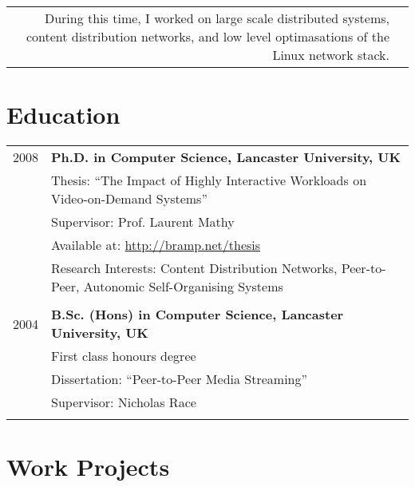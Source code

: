 \documentclass[a4paper,10pt]{article}
\begin{document}
\begin{tabular}{r|p{13.5cm}}
			During this time, I worked on large scale distributed systems, content distribution networks, and low level optimasations of the Linux
			network stack.
			\\


\end{tabular}

\section{Education}
\begin{tabular}{rp{14cm}}	
 \textsc{2008} & \textbf{Ph.D. in Computer Science, Lancaster University, UK}\\
& Thesis: ``The Impact of Highly Interactive Workloads on Video-on-Demand Systems''\\
& Supervisor: Prof. Laurent Mathy\\
& Available at: \href{http://bramp.net/thesis}{http://bramp.net/thesis}\\
& Research Interests: Content Distribution Networks, Peer-to-Peer, Autonomic Self-Organising Systems\\
&\\

\textsc{2004} & \textbf{B.Sc. (Hons) in Computer Science, Lancaster University, UK}\\
& First class honours degree\\
& Dissertation: ``Peer-to-Peer Media Streaming''\\
& Supervisor: Nicholas Race\\
&\\


\end{tabular}

\section{Work Projects}
 

\nocite{jakeman2009fna,faulkner2009epn,macquire2008acf,brampton2008cew,macquire2008asd,brampton2007cui,rai2007pmp,brampton2006sdh,macquire2006asd,macquire2006pas,brampton2005sdh}
\end{document}
